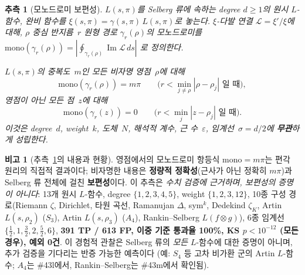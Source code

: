 \documentclass[11pt, a4paper]{article}
\theoremstyle{definition}
\newtheorem{remark}{비고}[section]
\theoremstyle{plain}
\newtheorem{conjecture}[theorem]{추측}
\begin{document}
\begin{conjecture}[모노드로미 보편성]
\label{conj:mono_universality}
$L(s,\pi)$를 Selberg 류에 속하는 degree $d \geq 1$의 원시 $L$-함수,
완비 함수를 $\xi(s,\pi) = \gamma(s,\pi)\,L(s,\pi)$로 놓는다.
$\xi$-다발 연결 $\mathcal{L} = \xi'/\xi$에 대해,
$\rho$ 중심 반지름~$r$ 원형 경로 $\gamma_r(\rho)$의 모노드로미를
$\mathrm{mono}(\gamma_r(\rho))
= |\oint_{\gamma_r(\rho)} \operatorname{Im}\mathcal{L}\,ds|$
로 정의한다.

$L(s,\pi)$의 중복도~$m$인 모든 비자명 영점~$\rho$에 대해
\[
  \mathrm{mono}(\gamma_r(\rho)) = m\pi
  \qquad
  \text{($r < \min_{j\neq\rho}|\rho - \rho_j|$ 일 때)},
\]
영점이 아닌 모든 점~$z$에 대해
\[
  \mathrm{mono}(\gamma_r(z)) = 0
  \qquad
  \text{($r < \min_j |z - \rho_j|$ 일 때)}.
\]
이것은 degree~$d$, weight~$k$, 도체~$N$, 해석적 계수,
근 수~$\varepsilon$, 임계선~$\sigma = d/2$에 \textbf{무관}하게 성립한다.
\end{conjecture}

\begin{remark}[추측~\ref{conj:mono_universality}의 내용과 현황]
\label{rem:mono_universality_content}
영점에서의 모노드로미 항등식 $\mathrm{mono} = m\pi$는 편각 원리의
직접적 결과이다; 비자명한 내용은 \textbf{정량적 정확성}(근사가 아닌 정확히 $m\pi$)과
Selberg 류 전체에 걸친 \textbf{보편성}이다.
이 추측은 \emph{수치 검증에 근거하며, 보편성의 증명이 아니다}:
13개 원시 $L$-함수, degree $\{1,2,3,4,5\}$, weight $\{1,2,3,12\}$,
10종 구성 경로(Riemann $\zeta$, Dirichlet, 타원 곡선, Ramanujan $\Delta$,
sym$^k$, Dedekind $\zeta_K$, Artin $L(s,\rho_2)$ ($S_3$),
Artin $L(s,\rho_3)$ ($A_4$), Rankin--Selberg $L(f \otimes g)$),
6종 임계선 $\{\tfrac12,1,\tfrac32,2,\tfrac52,6\}$,
\textbf{391 TP / 613 FP, 이중 기준 통과율 100\%,
KS $p < 10^{-12}$ (모든 경우), 예외 0건}.
이 경험적 관찰은 Selberg 류의 \emph{모든} $L$-함수에 대한 증명이 아니며,
추가 검증을 기다리는 반증 가능한 예측이다
(예: $S_4$ 등 고차 비가환 군의 Artin $L$-함수;
$A_4$는 \#43l에서, Rankin--Selberg는 \#43m에서 확인됨).
\end{remark}
\end{document}
